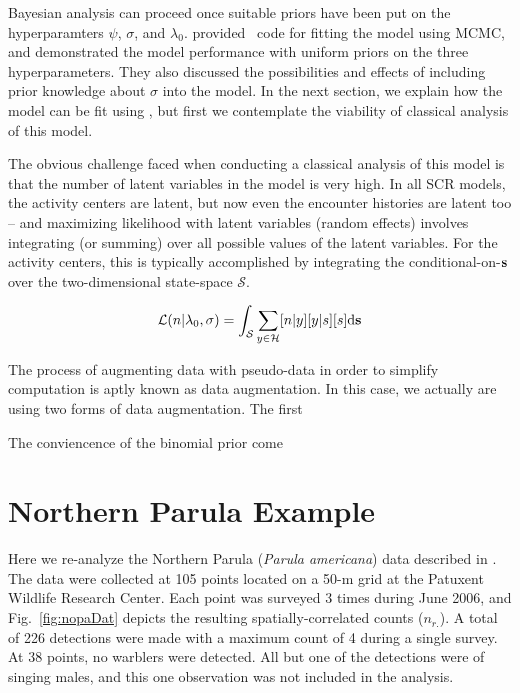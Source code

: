 Bayesian analysis can proceed once suitable priors have been put on
the hyperparamters $\psi$, $\sigma$, and
$\lambda_0$. \citet{chandler_royle:2013} provided \R~code for fitting
the model using MCMC, and demonstrated the model performance with
uniform priors on the three hyperparameters. They also discussed the
possibilities and effects of including prior knowledge about $\sigma$
into the model. In the next section, we explain how the model can be
fit using \jags, but first we contemplate the viability of classical
analysis of this model.

The obvious challenge faced when conducting a classical analysis of
this model is that the number of latent variables in the
model is very high. In all SCR models, the activity centers are
latent, but now even the encounter histories are latent too -- and
maximizing likelihood with latent variables (random effects) involves
integrating (or summing) over all possible values of the latent
variables. For the activity centers, this is typically accomplished by
integrating the conditional-on-$\bf s$ over the two-dimensional
state-space $\mathcal{S}$.

\begin{equation}
  \mathcal{L}(n|\lambda_0, \sigma) = \int_{\mathcal{S}} \sum_{y \in \mathcal{H}} [n|y][y|s][s] \mathrm{d}{\bf s}
  \label{eq:1}
\end{equation}





The process of augmenting data with pseudo-data in order to simplify
computation is aptly known as data augmentation. In this case, we
actually are using two forms of data augmentation. The first

The conviencence of the binomial prior come



\section{Northern Parula Example}

Here we re-analyze the Northern Parula ({\it Parula americana}) data
described in \citet{chandler_royle:2012}. The data were collected at
105 points located on a 50-m grid at the Patuxent Wildlife Research
Center. Each point was surveyed 3 times during June 2006, and
Fig.~\ref{fig:nopaDat} depicts the resulting spatially-correlated
counts ($n_{r.}$).
A total of 226 detections were made with a maximum count of 4 during a
single survey. At 38 points, no warblers were detected. All but one of
the detections were of singing males, and this one observation was
not included in the analysis.


